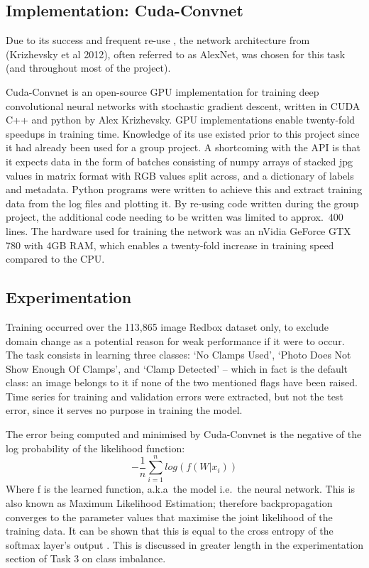 \documentclass[a4paper,11pt]{article}
\begin{document}
\subsection{Implementation: Cuda-Convnet}

Due to its success and frequent re-use \cite{rectifier} \cite{goodfellow_street_view} \cite{decaf} \cite{fergus_tutorial} \cite{colah} \cite{zeiler_fergus} \cite{transfer-learning} \cite{caffe-website}, the network architecture from (Krizhevsky et al 2012), often referred to as AlexNet, was chosen for this task (and throughout most of the project).

Cuda-Convnet is an open-source GPU implementation for training deep convolutional neural networks with stochastic gradient descent, written in CUDA C++ and python by Alex Krizhevsky. GPU implementations enable twenty-fold speedups\cite{soumith-benchmark} in training time. Knowledge of its use existed prior to this project since it had already been used for a group project. A shortcoming with the API is that it expects data in the form of batches consisting of numpy arrays of stacked jpg values in matrix format with RGB values split across, and a dictionary of labels and metadata. Python programs were written to achieve this and extract training data from the log files and plotting it. By re-using code written during the group project, the additional code needing to be written was limited to approx.\ 400 lines. The hardware used for training the network was an nVidia GeForce GTX 780 with 4GB RAM, which enables a twenty-fold increase in training speed compared to the CPU. 

\subsection{Experimentation}

Training occurred over the 113,865 image Redbox dataset only, to exclude domain change as a potential reason for weak performance if it were to occur. The task consists in learning three classes: `No Clamps Used', `Photo Does Not Show Enough Of Clamps', and `Clamp Detected' -- which in fact is the default class: an image belongs to it if none of the two mentioned flags have been raised. Time series for training and validation errors were extracted, but not the test error, since it serves no purpose in training the model. 

The error being computed and minimised by Cuda-Convnet is the negative of the log probability of the likelihood function:
\begin{equation}
-\frac{1}{n}\sum\limits_{i=1}^n log(f(W|x_i))
\end{equation}
Where f is the learned function, a.k.a\ the model i.e.\ the neural network. This is also known as Maximum Likelihood Estimation; therefore backpropagation converges to the parameter values that maximise the joint likelihood of the training data. It can be shown that this is equal to the cross entropy of the softmax layer's output \cite{DL-book}. This is discussed in greater length in the experimentation section of Task 3 on class imbalance. 
\end{document}

